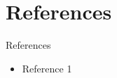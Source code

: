 \documentclass{beamer}
\begin{document}
\section{References}
\begin{frame}{References}
    \begin{itemize}
        \item Reference 1
    \end{itemize}
\end{frame}


\end{document}
